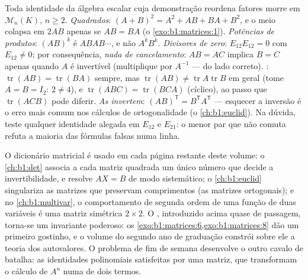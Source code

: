 \begin{remark}
\label{rem:b1:matrices:pitfalls}
Toda identidade da álgebra escalar cuja demonstração reordena
fatores morre em $\mathcal{M}_n(K)$, $n \geq 2$.
\emph{Quadrados}: $(A + B)^2 = A^2 + AB + BA + B^2$, e o meio colapsa em $2AB$ apenas se
$AB = BA$ (o \cref{exo:b1:matrices:1}).
\emph{Potências de produtos}: $(AB)^k$ é $ABAB\cdots$, e não $A^kB^k$.
\emph{Divisores de zero}: $E_{12}E_{12} = 0$ com $E_{12} \neq 0$; por consequência,
\emph{nada de cancelamento}: $AB = AC$ implica $B = C$ apenas quando
$A$ é invertível (multiplique por $A^{-1}$ --- do lado correto).
\emph{}: $\operatorname{tr}(AB) = \operatorname{tr}(BA)$ sempre, mas $\operatorname{tr}(AB) \neq
\operatorname{tr}A\operatorname{tr}B$ em geral (tome $A = B =
I_2$:
$2 \neq 4$), e $\operatorname{tr}(ABC) =
\operatorname{tr}(BCA)$ (cíclico), ao passo que $\operatorname{tr}(ACB)$ pode diferir.
\emph{As  invertem}: $(AB)^{\mathsf T} = B^{\mathsf
T}A^{\mathsf T}$ --- esquecer a inversão é o
erro mais comum nos cálculos de ortogonalidade (o \cref{ch:b1:euclid}).
Na dúvida, teste qualquer identidade alegada em $E_{12}$ e
$E_{21}$: o menor par que não comuta refuta a maioria das fórmulas
falsas numa linha.
\end{remark}

\begin{remark}
\label{rem:b1:matrices:whereused}
O dicionário matricial é usado em cada página restante deste
volume: o \cref{ch:b1:det} associa a cada matriz quadrada um único número que
decide a invertibilidade, e resolve $AX = B$ de modo sistemático;
o \cref{ch:b1:euclid} singulariza as matrizes que preservam comprimentos (as
matrizes ortogonais); e no \cref{ch:b1:multivar}, o comportamento de segunda ordem
de uma função de duas variáveis é uma matriz simétrica $2 \times 2$. O
, introduzido acima quase de passagem, torna-se um invariante
poderoso: os \cref{exo:b1:matrices:6,exo:b1:matrices:8} dão um primeiro gostinho, e o volume do segundo
ano de graduação constrói sobre ele a teoria dos autovalores. O
problema de fim de semana desenvolve o outro cavalo de batalha: as
identidades polinomiais satisfeitas por uma matriz, que transformam
o cálculo de $A^n$ numa  de dois termos.
\end{remark}

